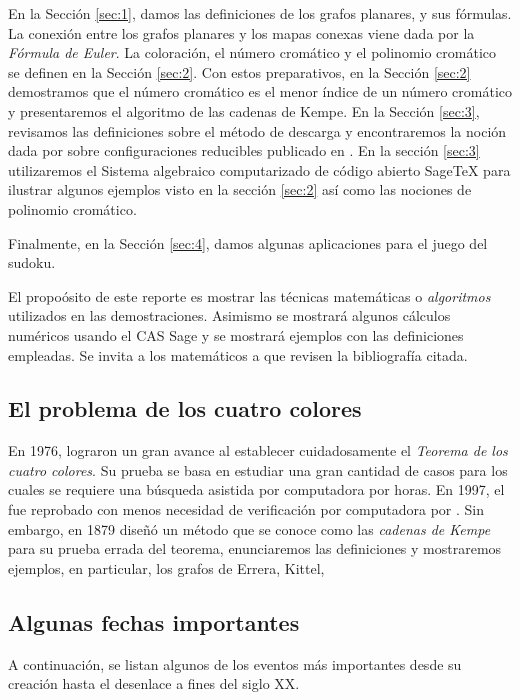 \documentclass[3p,times,a4paper,twocolumn,authoryear]{elsarticle} %
\begin{document}
En la Sección \ref{sec:1}, damos las definiciones de los grafos planares,  y sus fórmulas. La conexión entre los grafos planares y los mapas conexas viene dada por la \emph{Fórmula de Euler}. La coloración, el número cromático y el polinomio cromático se definen en la Sección \ref{sec:2}. Con estos preparativos, en la Sección \ref{sec:2} demostramos que el número cromático es el menor índice de un número cromático y presentaremos el algoritmo de las cadenas de Kempe. En la Sección \ref{sec:3}, revisamos las definiciones sobre el método de descarga y encontraremos la noción dada por \citeauthor{birkhoff} sobre configuraciones reducibles publicado en \cite{birkhoff}. En la sección \ref{sec:3} utilizaremos el Sistema algebraico computarizado de código abierto Sage\TeX{} para ilustrar algunos ejemplos visto en la sección \ref{sec:2} así como las nociones de polinomio cromático.

Finalmente, en la Sección \ref{sec:4}, damos algunas aplicaciones para el juego del sudoku.

El propoósito de este reporte es mostrar las técnicas matemáticas o \emph{algoritmos} utilizados en las demostraciones. Asimismo se mostrará algunos cálculos numéricos usando el CAS Sage y se mostrará ejemplos con las definiciones empleadas. Se invita a los matemáticos a que revisen la bibliografía citada.

\subsection{El problema de los cuatro colores}\label{sec:1.1}

En 1976, \citeauthor{appel} lograron un gran avance al establecer cuidadosamente el \emph{Teorema de los cuatro colores}. Su prueba se basa en estudiar una gran cantidad de casos para los cuales se requiere una búsqueda asistida por computadora por horas. En 1997, el fue reprobado con menos necesidad de verificación por computadora por \citeauthor{Robin}. Sin embargo, \citeauthor{kempe} en 1879 diseñó un método que se conoce como las \emph{cadenas de Kempe} para su prueba errada del teorema, enunciaremos las definiciones y mostraremos ejemplos, en particular, los grafos de Errera, Kittel, 

\subsection{Algunas fechas importantes}\label{sec:1.2}

A continuación, se listan algunos de los eventos más importantes desde su creación hasta el desenlace a fines del siglo XX.
\end{document}
